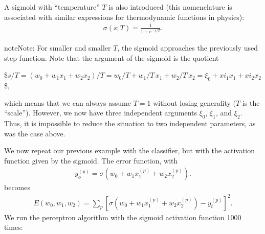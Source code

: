 \documentclass[letterpaper,10pt,english]{jupyterBook}
\begin{document}
\noindent{}

\sphinxAtStartPar
A sigmoid with “temperature” \( T \) is also introduced (this nomenclature is associated with similar expressions for thermodynamic functions in physics):
\begin{equation*}
\begin{split}\sigma(s;T)=\frac{1}{1+e^{-s/T}}.\end{split}
\end{equation*}
\begin{sphinxVerbatim}[commandchars=\\\{\}]
 
     
\end{sphinxVerbatim}

\noindent{}

\begin{sphinxadmonition}{note}{Note:}
\sphinxAtStartPar
For smaller and smaller \( T \), the sigmoid approaches the previously used step function. Note that the argument of the sigmoid is the quotient

\sphinxAtStartPar
\$\( s / T = (w_0 + w_1 x_1 + w_2 x_2) / T = w_0 / T + w_1 / T \, x_1 + w_2 / T \, x_2 = \xi_0 + xi_1 x_1 + xi_2 x_2 \)\$,

\sphinxAtStartPar
which means that we can always assume \( T = 1 \) without losing generality (\( T \) is the “scale”). However, we now have three independent arguments \( \xi_0 \), \( \xi_1 \), and \( \xi_2\). Thus, it is impossible to reduce the situation to two independent parameters, as was the case above.
\end{sphinxadmonition}

\sphinxAtStartPar
We now repeat our previous example with the classifier, but with the activation function given by the sigmoid. The error function, with
\begin{equation*}
\begin{split}y_o^{(p)}=\sigma(w_0+w_1 x_1^{(p)} +w_2 x_2^{(p)}). \end{split}
\end{equation*}
\sphinxAtStartPar
becomes
\begin{equation*}
\begin{split}E(w_0,w_1,w_2)=\sum_p \left [\sigma(w_0+w_1 x_1^{(p)} +w_2 x_2^{(p)})-y_t^{(p)} \right]^2.\end{split}
\end{equation*}
\sphinxAtStartPar
We run the perceptron algorithm with the sigmoid activation function 1000 times:
\end{document}
